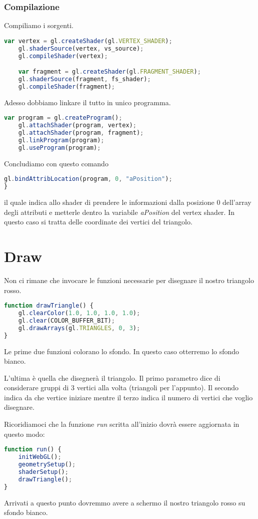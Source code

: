\subsubsection{Compilazione}
Compiliamo i sorgenti.
\begin{lstlisting}[language=javascript, firstnumber=14]
	var vertex = gl.createShader(gl.VERTEX_SHADER);
	gl.shaderSource(vertex, vs_source);
	gl.compileShader(vertex);

	var fragment = gl.createShader(gl.FRAGMENT_SHADER);
	gl.shaderSource(fragment, fs_shader);
	gl.compileShader(fragment);
\end{lstlisting}
\newpage
Adesso dobbiamo linkare il tutto in unico programma.
\begin{lstlisting}[language=javascript, firstnumber=21]
	var program = gl.createProgram();
	gl.attachShader(program, vertex);
	gl.attachShader(program, fragment);
	gl.linkProgram(program);
	gl.useProgram(program);
\end{lstlisting}
Concludiamo con questo comando
\begin{lstlisting}[language=javascript, firstnumber=26]
	gl.bindAttribLocation(program, 0, "aPosition");
}
\end{lstlisting}
il quale indica allo shader di prendere le informazioni dalla posizione 0 dell'array degli
attributi e metterle dentro la variabile \emph{aPosition} del vertex shader. In questo caso
si tratta delle coordinate dei vertici del triangolo.

\section{Draw}
Non ci rimane che invocare le funzioni necessarie per disegnare il nostro triangolo rosso.
\begin{lstlisting}[language=javascript]
function drawTriangle() {
	gl.clearColor(1.0, 1.0, 1.0, 1.0);
	gl.clear(COLOR_BUFFER_BIT);
	gl.drawArrays(gl.TRIANGLES, 0, 3);
}
\end{lstlisting}
Le prime due funzioni colorano lo sfondo. In questo caso otterremo lo sfondo bianco.

L'ultima \`e quella che disegner\`a il triangolo. Il primo parametro dice di considerare
gruppi di 3 vertici alla volta (triangoli per l'appunto). Il secondo indica da che vertice
iniziare mentre il terzo indica il numero di vertici che voglio disegnare.

Ricoridiamoci che la funzione \emph{run} scritta all'inizio dovr\`a essere aggiornata
in questo modo:
\begin{lstlisting}[language=javascript]
function run() {
	initWebGL();
	geometrySetup();
	shaderSetup();
	drawTriangle();
}
\end{lstlisting}
Arrivati a questo punto dovremmo avere a schermo il nostro triangolo rosso su sfondo bianco.